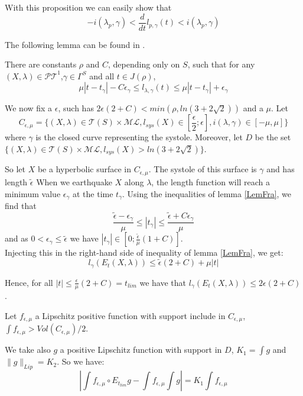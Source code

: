 With this proposition we can easily show that \[
-i(\lambda_p,\gamma) < \frac{d}{dt} l_{p,\gamma}(t) < i(\lambda_p,\gamma)
\]

The following lemma can be found in \cite{articleMetW}.

\begin{lem}\label{LemFra}

There are constants $\rho$ and $C$, depending only on $S$, such that for any $(X, \lambda) \in \mathcal{PT}^1$,$\gamma \in \Gamma^S$
and all $t\in J(\rho)$, \[
\mu |t-t_\gamma |-C \epsilon_\gamma \leq l_{\lambda,\gamma}(t) \leq \mu |t- t_\gamma | + \epsilon_\gamma
\]

\end{lem}

We now fix a $\epsilon$, such has $2 \epsilon(2+C) < min( \rho , ln(3+2 \sqrt{2}))$ and a $\mu$. Let \[
C_{\epsilon,\mu}=\{ (X,\lambda) \in \mathcal{T}(S) \times \mathcal{ML},l_{sys}(X) \in  [\frac{\epsilon}{2};\epsilon], i(\lambda,\gamma) \in [-\mu,\mu]  \}
\]
where $\gamma$ is the closed curve representing the systole. Moreover, let $D$ be the set $\{ (X,\lambda) \in \mathcal{T}(S) \times \mathcal{ML},l_{sys}(X) > ln(3+2 \sqrt{2}) \} $.

So let $X$ be a hyperbolic surface in $C_{\epsilon,\mu}$. The systole of this surface is $\gamma$ and has length $\tilde{\epsilon}$
When we earthquake $X$ along $\lambda$, the length function will reach a minimum value $\epsilon_\gamma$ at the time $t_\gamma$. Using the inequalities of lemma \ref{LemFra}, we find that \[
\frac{\tilde{\epsilon}-\epsilon_\gamma}{\mu} \leq |t_\gamma | \leq \frac{\tilde{\epsilon} + C \epsilon_\gamma}{\mu}
\]
and as $0 < \epsilon_\gamma \leq \tilde{\epsilon}$ we have $|t_\gamma| \in [0; \frac{\tilde{\epsilon}}{\mu}(1+C)]$. \\
Injecting this in the right-hand side of inequality of lemma \ref{LemFra}, we get: \[
l_\gamma (E_t (X,\lambda)) \leq \tilde{\epsilon} (2+C) +\mu |t|
\]

Hence, for all $|t| \leq \frac{\epsilon}{\mu}(2+C) = t_{lim}$ we have that $l_\gamma(E_t(X,\lambda)) \leq 2 \epsilon (2+C)$.

Let $f_{\epsilon,\mu}$ a Lipschitz positive function with support include in $C_{\epsilon,\mu}$, $\int f_{\epsilon,\mu} > Vol(C_{\epsilon,\mu})/2$.

We take also $g$ a positive Lipschitz function with support in $D$, $K_1= \int g$ and $\| g \|_{Lip}= K_2$.
So we have:\[
\left| \int f_{\epsilon,\mu} \circ E_{t_{lim}} g - \int f_{\epsilon,\mu} \int g \right| =K_1 \int f_{\epsilon,\mu}
\]

